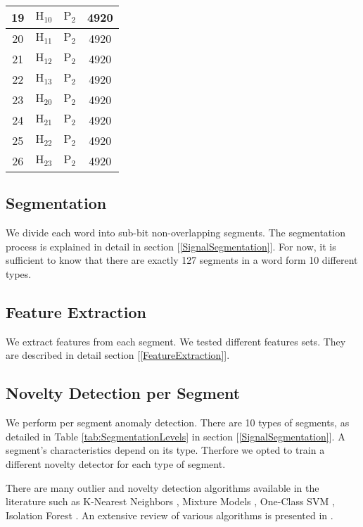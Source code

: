 \documentclass[conference]{IEEEtran}
\begin{document}
\begin{table}
\begin{tabular}{|c | c c c|}
      19 & \(\text{H}_{10}\) & \(\text{P}_2\) & 4920 \\
      \hline
      20 & \(\text{H}_{11}\) & \(\text{P}_2\) & 4920 \\
      \hline
      21 & \(\text{H}_{12}\) & \(\text{P}_2\) & 4920 \\
      \hline
      22 & \(\text{H}_{13}\) & \(\text{P}_2\) & 4920 \\
      \hline
      23 & \(\text{H}_{20}\) & \(\text{P}_2\) & 4920 \\
      \hline
      24 & \(\text{H}_{21}\) & \(\text{P}_2\) & 4920 \\
      \hline
      25 & \(\text{H}_{22}\) & \(\text{P}_2\) & 4920 \\
      \hline
      26 & \(\text{H}_{23}\) & \(\text{P}_2\) & 4920 \\
      \hline
    \end{tabular}
  \end{table}
  
\subsection{Segmentation}
  We divide each word into sub-bit non-overlapping segments. The segmentation process is explained in detail in section [\ref{SignalSegmentation}]. For now, it is sufficient to know that there are exactly 127 segments in a word form 10 different types.

\subsection{Feature Extraction}
  We extract features from each segment. We tested different features sets. They are described in detail section [\ref{FeatureExtraction}].

\subsection{Novelty Detection per Segment}
  We perform per segment anomaly detection. There are 10 types of segments, as detailed in Table \ref{tab:SegmentationLevels} in section [\ref{SignalSegmentation}]. A segment's characteristics depend on its type. Therfore we opted to train a different novelty detector for each type of segment.
  
  There are many outlier and novelty detection algorithms available in the literature such as K-Nearest Neighbors \cite{hautamaki2004outlier}, Mixture Models \cite{}, One-Class SVM \cite{}, Isolation Forest \cite{liu2008isolation}. An extensive review of various algorithms is presented in \cite{pimentel2014review}.
  
\end{document}
